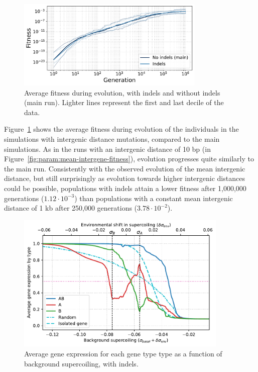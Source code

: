 \begin{figure}[H]
\centering
\includegraphics[width=0.8\textwidth]{param/evolve-intergene/fitness_all_with_main.pdf}
\caption[Average fitness during evolution, with indels]{Average fitness during evolution, with indels and without indels (main run).
Lighter lines represent the first and last decile of the data.}
\label{fig:param:evolve-intergene-fitness}
\end{figure}

Figure~\ref{fig:param:evolve-intergene-fitness} shows the average fitness during evolution of the individuals in the simulations with intergenic distance mutations, compared to the main simulations.
As in the runs with an intergenic distance of 10 bp (in Figure~\ref{fig:param:mean-intergene-fitness}), evolution progresses quite similarly to the main run.
Consistently with the observed evolution of the mean intergenic distance, but still surprisingly as evolution towards higher intergenic distances could be possible, populations with indels attain a lower fitness after 1,000,000 generations ($1.12\cdot10^{-3}$) than populations with a constant mean intergenic distance of 1 kb after 250,000 generations ($3.78\cdot 10^{-2}$).

\begin{figure}[H]
\centering
\includegraphics[width=0.9\textwidth]{param/evolve-intergene/activity_sigmas_avg.pdf}
\caption[Average gene expression as a function of background supercoiling, with indels]{Average gene expression for each gene type type as a function of background supercoiling, with indels.}
\label{fig:param:evolve-intergene-activ-by-sigma}
\end{figure}

